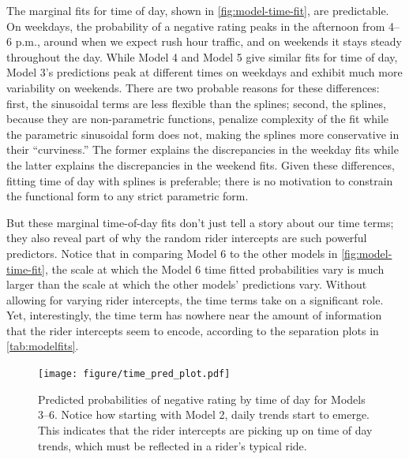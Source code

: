 \documentclass[12pt,twoside]{reedthesis}
\begin{document}
  The marginal fits for time of day, shown in
  \autoref{fig:model-time-fit}, are predictable. On weekdays, the
  probability of a negative rating peaks in the afternoon from 4--6 p.m.,
  around when we expect rush hour traffic, and on weekends it stays steady
  throughout the day. While Model 4 and Model 5 give similar fits for time
  of day, Model 3's predictions peak at different times on weekdays and
  exhibit much more variability on weekends. There are two probable
  reasons for these differences: first, the sinusoidal terms are less
  flexible than the splines; second, the splines, because they are
  non-parametric functions, penalize complexity of the fit while the
  parametric sinusoidal form does not, making the splines more
  conservative in their ``curviness.'' The former explains the
  discrepancies in the weekday fits while the latter explains the
  discrepancies in the weekend fits. Given these differences, fitting time
  of day with splines is preferable; there is no motivation to constrain
  the functional form to any strict parametric form.
  
  But these marginal time-of-day fits don't just tell a story about our
  time terms; they also reveal part of why the random rider intercepts are
  such powerful predictors. Notice that in comparing Model 6 to the other
  models in \autoref{fig:model-time-fit}, the scale at which the Model 6
  time fitted probabilities vary is much larger than the scale at which
  the other models' predictions vary. Without allowing for varying rider
  intercepts, the time terms take on a significant role. Yet,
  interestingly, the time term has nowhere near the amount of information
  that the rider intercepts seem to encode, according to the separation
  plots in \autoref{tab:modelfits}.
  
  \begin{figure}[tbh]
  \centering
  \texttt{[image: figure/time\_pred\_plot.pdf]}
  \caption[Predicted probabilities of negative rating by time of day for Models 3--6]{\normalsize{Predicted probabilities of negative rating by time of day for Models 3--6.
  Notice how starting with Model 2, daily trends start to emerge. This indicates that the
  rider intercepts are picking up on time of day trends, which must be reflected in a rider's
  typical ride.}}
  \label{fig:time-pred-plot}
  \end{figure}
  
\end{document}
